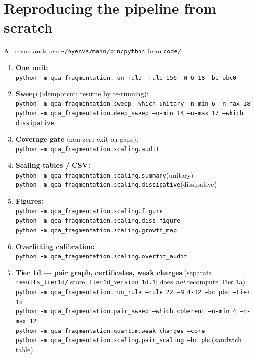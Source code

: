 \documentclass[11pt]{article}
\newcommand{\rt}[1]{\texttt{#1}}
\newcommand{\pf}[1]{\texttt{#1}}          %
\begin{document}
\section{Reproducing the pipeline from scratch}
\label{sec:repro}
All commands use \pf{\textasciitilde/pyenvs/main/bin/python} from \pf{code/}.
\begin{enumerate}
\item \textbf{One unit:}\\
  \rt{python -m qca\_fragmentation.run\_rule --rule 156 --N 6-18 --bc obc0}
\item \textbf{Sweep} (idempotent; resume by re-running):\\
  \rt{python -m qca\_fragmentation.sweep --which unitary --n-min 6 --n-max 18}\\
  \rt{python -m qca\_fragmentation.deep\_sweep --n-min 14 --n-max 17 --which dissipative}
\item \textbf{Coverage gate} (non-zero exit on gaps):\\
  \rt{python -m qca\_fragmentation.scaling.audit}
\item \textbf{Scaling tables / CSV:}\\
  \rt{python -m qca\_fragmentation.scaling.summary}\qquad(unitary)\\
  \rt{python -m qca\_fragmentation.scaling.dissipative}\quad(dissipative)
\item \textbf{Figures:}\\
  \rt{python -m qca\_fragmentation.scaling.figure}\\
  \rt{python -m qca\_fragmentation.scaling.diss\_figure}\\
  \rt{python -m qca\_fragmentation.scaling.growth\_map}
\item \textbf{Overfitting calibration:}\\
  \rt{python -m qca\_fragmentation.scaling.overfit\_audit}
\item \textbf{Tier 1d --- pair graph, certificates, weak charges} (separate
  \pf{results\_tier1d/} store, \rt{tier1d\_version 1d.1}; does \emph{not}
  recompute Tier 1a):\\
  \rt{python -m qca\_fragmentation.run\_rule --rule 22 --N 4-12 --bc pbc --tier 1d}\\
  \rt{python -m qca\_fragmentation.pair\_sweep --which coherent --n-min 4 --n-max 12}\\
  \rt{python -m qca\_fragmentation.quantum.weak\_charges --core}\\
  \rt{python -m qca\_fragmentation.scaling.pair\_scaling --bc pbc}\qquad(sandwich table)\\

\end{enumerate}
\end{document}
